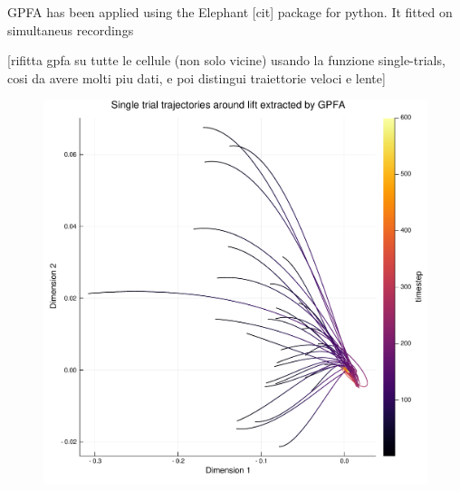 
GPFA has been applied using the Elephant [cit] package for python. It fitted on simultaneus recordings 

[rifitta gpfa su tutte le cellule (non solo vicine) usando la funzione  single-trials, cosi da avere molti piu dati, e poi distingui traiettorie veloci e lente]

\begin{figure}[h!]
	\centering
	\includegraphics[scale=0.5]{../../plots/gpfa2d.pdf}
	\caption{}
	\label{fig:gpfa2d}
\end{figure}

